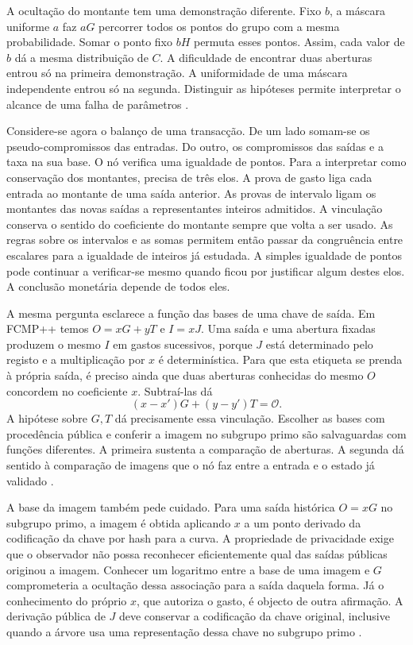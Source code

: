 A ocultação do montante tem uma demonstração diferente. Fixo \(b\),
a máscara uniforme \(a\) faz \(aG\) percorrer todos os pontos do grupo
com a mesma probabilidade. Somar o ponto fixo \(bH\) permuta esses
pontos. Assim, cada valor de \(b\) dá a mesma distribuição de \(C\).
A dificuldade de encontrar duas aberturas entrou só na primeira
demonstração. A uniformidade de uma máscara independente entrou só
na segunda. Distinguir as hipóteses permite interpretar o alcance de
uma falha de parâmetros \cite{Pedersen1992}.

Considere-se agora o balanço de uma transacção. De um lado somam-se
os pseudo-compromissos das entradas. Do outro, os compromissos das
saídas e a taxa na sua base. O nó verifica uma igualdade de pontos.
Para a interpretar como conservação dos montantes, precisa de três
elos. A prova de gasto liga cada entrada ao montante de uma saída
anterior. As provas de intervalo ligam os montantes das novas saídas a
representantes inteiros admitidos. A vinculação conserva o sentido do
coeficiente do montante sempre que volta a ser usado. As regras sobre
os intervalos e as somas permitem então passar da congruência entre
escalares para a igualdade de inteiros já estudada. A simples
igualdade de pontos pode continuar a verificar-se mesmo quando ficou
por justificar algum destes elos. A conclusão monetária depende de
todos eles.

A mesma pergunta esclarece a função das bases de uma chave de saída.
Em FCMP++ temos \(O=xG+yT\) e \(I=xJ\). Uma saída e uma abertura
fixadas produzem o mesmo \(I\) em gastos sucessivos, porque \(J\)
está determinado pelo registo e a multiplicação por \(x\) é
determinística. Para que esta etiqueta se prenda à própria saída,
é preciso ainda que duas aberturas conhecidas do mesmo \(O\)
concordem no coeficiente \(x\). Subtraí-las dá
\[
          (x-x')G+(y-y')T=\mathcal O .
\]
A hipótese sobre \(G,T\) dá precisamente essa vinculação.
Escolher as bases com procedência pública e conferir a imagem no
subgrupo primo são salvaguardas com funções diferentes. A primeira
sustenta a comparação de aberturas. A segunda dá sentido à
comparação de imagens que o nó faz entre a entrada e o estado já
validado \cite{fcmp-plus-plus-paper,fcmp-composition-review}.

A base da imagem também pede cuidado. Para uma saída histórica
\(O=xG\) no subgrupo primo, a imagem é obtida aplicando \(x\) a um
ponto derivado da codificação da chave por hash para a curva. A
propriedade de privacidade exige que o observador não possa
reconhecer eficientemente qual das saídas públicas originou a imagem.
Conhecer um logaritmo entre a base de uma imagem e \(G\) comprometeria
a ocultação dessa associação para a saída daquela forma. Já o
conhecimento do próprio \(x\), que autoriza o gasto, é objecto de
outra afirmação. A derivação pública de \(J\) deve conservar a
codificação da chave original, inclusive quando a árvore usa uma
representação dessa chave no subgrupo primo
\cite{monero-source-current-fcmp-tree}.

